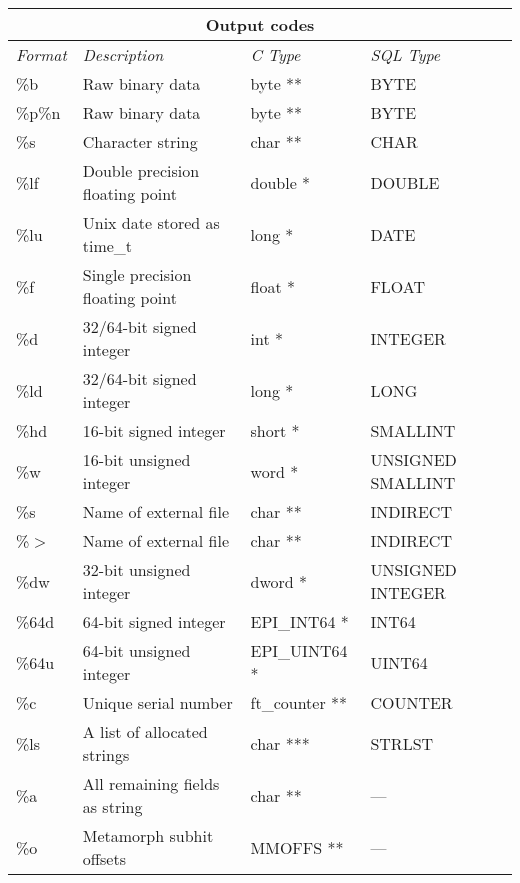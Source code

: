 \begin{table}{\label{tab:gfmtcodes}}
\begin{tabular}{|l|l|l|l|} \hline
\multicolumn{4}{|c|}{Output codes} \\ \hline
{\em Format}  & {\em Description}               & {\em C Type}  & {\em SQL Type}    \\ \hline
\%b           & Raw binary data                 & byte **       & BYTE              \\
\%p\%n        & Raw binary data                 & byte **       & BYTE              \\
\%s           & Character string                & char **       & CHAR              \\
\%lf          & Double precision floating point & double *      & DOUBLE            \\
\%lu          & Unix date stored as time\_t     & long *        & DATE              \\
\%f           & Single precision floating point & float *       & FLOAT             \\
\%d           & 32/64-bit signed integer        & int  *        & INTEGER           \\
\%ld          & 32/64-bit signed integer        & long *        & LONG           \\
\%hd          & 16-bit signed integer           & short *       & SMALLINT          \\
\%w           & 16-bit unsigned integer         & word *        & UNSIGNED SMALLINT \\
\%s           & Name of external file           & char **       & INDIRECT          \\
\%$>$         & Name of external file           & char **       & INDIRECT          \\
\%dw          & 32-bit unsigned integer         & dword *       & UNSIGNED INTEGER  \\
\%64d         & 64-bit signed integer           & EPI\_INT64 *  & INT64             \\
\%64u         & 64-bit unsigned integer         & EPI\_UINT64 * & UINT64            \\
\%c           & Unique serial number            & ft\_counter **& COUNTER           \\
\%ls          & A list of allocated strings     & char ***      & STRLST            \\
\%a           & All remaining fields as string  & char **       & ---               \\
\%o           & Metamorph subhit offsets        & MMOFFS **     & ---               \\ \hline
\end{tabular}
\end{table}

